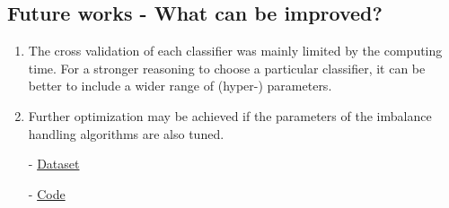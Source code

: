 \documentclass[letterpaper, 11 pt, conference]{ieeeconf}  %
\begin{document}
\subsection*{Future works - What can be improved?}

\begin{enumerate}
\item The cross validation of each classifier was mainly limited by the computing time. For a stronger reasoning to choose a particular classifier, it can be better to include a wider range of (hyper-) parameters.

\item Further optimization may be achieved if the parameters of the imbalance handling algorithms are also tuned.
\end{enumerate}






\begin{itemize}
    \item[-] \href{https://www.kaggle.com/datasets/joebeachcapital/credit-card-fraud/}{Dataset}
    \item[-] \href{https://github.com/DarkWake9/Project-ML}{Code}
\end{itemize}
\end{document}
